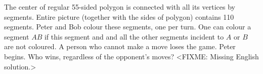 \problem
The center of regular 55-sided polygon is connected with all its vertices by
segments.
Entire picture (together with the sides of polygon) contains 110 segments.
Peter and Bob colour these segments, one per turn.
One can colour a segment $AB$ if this segment and and all the other segments
incident to $A$ or $B$ are not coloured.
A person who cannot make a move loses the game.
Peter begins.
Who wins, regardless of the opponent's moves?
\solution
<FIXME: Missing English solution.>
\endproblem
